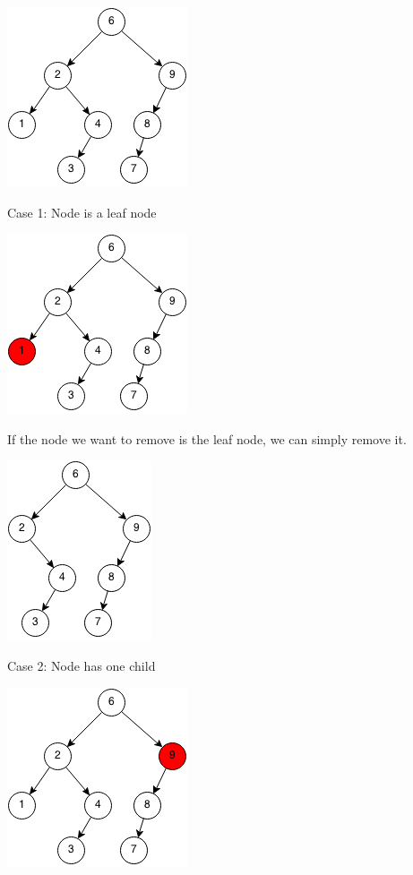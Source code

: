 \documentclass[11pt,oneside]{book}
\makeatletter
\def\maxwidth#1{\ifdim\Gin@nat@width>#1 #1\else\Gin@nat@width\fi}
\makeatother
\begin{document}
\vspace{5px}\includegraphics[width=\maxwidth{\textwidth}]{bst-rem.png}

Case 1: Node is a leaf node

\vspace{5px}\includegraphics[width=\maxwidth{\textwidth}]{bst-rem-case11.png}

If the node we want to remove is the leaf node, we can simply remove it.

\vspace{5px}\includegraphics[width=\maxwidth{\textwidth}]{bst-rem-case12.png}

Case 2: Node has one child

\vspace{5px}\includegraphics[width=\maxwidth{\textwidth}]{bst-rem-case21.png}
\end{document}
